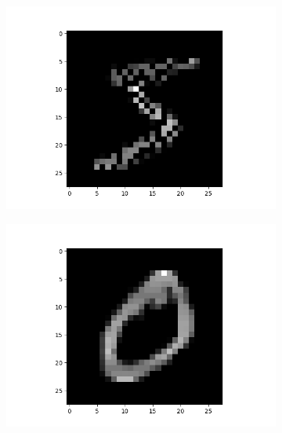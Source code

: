 \documentclass[12pt,a4paper]{article}
\begin{document}
\begin{enumerate}[a)]
\begin{enumerate}[i.]
\begin{figure}[H]
\begin{subfigure}{0.5\textwidth}
                                    \includegraphics[width=\textwidth]{images/im8.png}
                                \end{subfigure}
                            \end{figure}
                            \begin{figure}[H]
                                \begin{subfigure}{0.5\textwidth}
                                    \raggedleft
                                    \includegraphics[width=\textwidth]{images/im5.png}
                                \end{subfigure}
                                \begin{subfigure}{0.5\textwidth}

\end{subfigure}
\end{figure}
\end{enumerate}
\end{enumerate}
\end{document}
